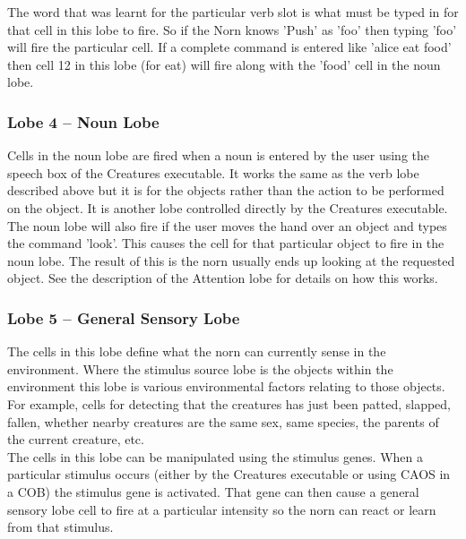 \documentclass[11pt,twoside,a4paper]{article}
\begin{document}
The word that was learnt for the particular verb slot is what must be typed in for that cell in this lobe to fire. So if the Norn knows 'Push' as 'foo' then typing 'foo' will fire the particular cell. If a complete command is entered like 'alice eat food' then cell 12 in this lobe (for eat) will fire along with the 'food' cell in the noun lobe.

\subsubsection{Lobe 4 -- Noun Lobe}

Cells in the noun lobe are fired when a noun is entered by the user using the speech box of the Creatures executable. It works the same as the verb lobe described above but it is for the objects rather than the action to be performed on the object. It is another lobe controlled directly by the Creatures executable.~\\

The noun lobe will also fire if the user moves the hand over an object and types the command 'look'. This causes the cell for that particular object to fire in the noun lobe. The result of this is the norn usually ends up looking at the requested object. See the description of the Attention lobe for details on how this works.

\subsubsection{Lobe 5 -- General Sensory Lobe}

The cells in this lobe define what the norn can currently sense in the environment. Where the stimulus source lobe is the objects within the environment this lobe is various environmental factors relating to those objects. For example, cells for detecting that the creatures has just been patted, slapped, fallen, whether nearby creatures are the same sex, same species, the parents of the current creature, etc.~\\

The cells in this lobe can be manipulated using the stimulus genes. When a particular stimulus occurs (either by the Creatures executable or using CAOS in a COB) the stimulus gene is activated. That gene can then cause a general sensory lobe cell to fire at a particular intensity so the norn can react or learn from that stimulus.~\\

\end{document}
